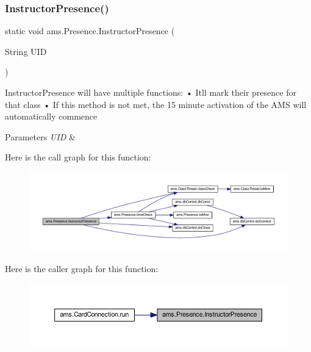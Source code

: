 \mbox{\label{classams_1_1_presence_a1ffc74f2f36c4c792834abcc5e2c28ea}} 
\subsubsection{\texorpdfstring{InstructorPresence()}{InstructorPresence()}}
{\footnotesize\ttfamily static void ams.\+Presence.\+Instructor\+Presence (\begin{DoxyParamCaption}\item[{String}]{U\+ID }\end{DoxyParamCaption})\hspace{0.3cm}{\ttfamily [static]}}

Instructor\+Presence will have multiple functions\+: • It\textquotesingle{}ll mark their presence for that class • If this method is not met, the 15 minute activation of the A\+MS will automatically commence


\begin{DoxyParams}{Parameters}
{\em U\+ID} & \\
\hline
\end{DoxyParams}
Here is the call graph for this function\+:\nopagebreak
\begin{figure}[H]
\begin{center}
\leavevmode
\includegraphics[width=350pt]{classams_1_1_presence_a1ffc74f2f36c4c792834abcc5e2c28ea_cgraph}
\end{center}
\end{figure}
Here is the caller graph for this function\+:\nopagebreak
\begin{figure}[H]
\begin{center}
\leavevmode
\includegraphics[width=350pt]{classams_1_1_presence_a1ffc74f2f36c4c792834abcc5e2c28ea_icgraph}
\end{center}
\end{figure}
\mbox{\label{classams_1_1_presence_a6f7a875d8decb48536c8eb9a6ef8d3d2}} 
